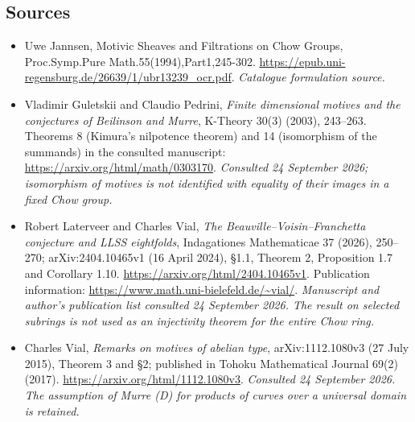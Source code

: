 \documentclass[11pt]{article}
\begin{document}
\subsection{Sources}
\begin{itemize}\raggedright
\item[\textnormal{[S1]}]\hypertarget{source:153:1}{} Uwe Jannsen, Motivic Sheaves and Filtrations on Chow Groups, Proc.Symp.Pure Math.55(1994),Part1,245-302.
\url{https://epub.uni-regensburg.de/26639/1/ubr13239_ocr.pdf}.
{\small\textit{Catalogue formulation source.}}
\item[\textnormal{[E1]}]\hypertarget{extra:153:1}{} Vladimir Guletskii and
Claudio Pedrini, \emph{Finite dimensional motives and the conjectures of
Beilinson and Murre}, K-Theory 30(3) (2003), 243--263.
Theorems 8 (Kimura's nilpotence theorem) and 14 (isomorphism of the summands)
in the consulted manuscript:
\url{https://arxiv.org/html/math/0303170}.
{\small\textit{Consulted 24 September 2026; isomorphism of motives is not
identified with equality of their images in a fixed Chow group.}}
\item[\textnormal{[E2]}]\hypertarget{extra:153:2}{} Robert Laterveer and Charles
Vial, \emph{The Beauville--Voisin--Franchetta conjecture and LLSS eightfolds},
Indagationes Mathematicae 37 (2026), 250--270;
arXiv:2404.10465v1 (16 April 2024), \S1.1, Theorem 2, Proposition 1.7 and
Corollary 1.10.
\url{https://arxiv.org/html/2404.10465v1}.
Publication information:
\url{https://www.math.uni-bielefeld.de/~vial/}.
{\small\textit{Manuscript and author's publication list consulted
24 September 2026. The result on selected subrings is not used as an
injectivity theorem for the entire Chow ring.}}
\item[\textnormal{[E3]}]\hypertarget{extra:153:3}{} Charles Vial,
\emph{Remarks on motives of abelian type}, arXiv:1112.1080v3
(27 July 2015), Theorem 3 and \S2; published in Tohoku Mathematical Journal
69(2) (2017).
\url{https://arxiv.org/html/1112.1080v3}.
{\small\textit{Consulted 24 September 2026. The assumption of Murre (D)
for products of curves over a universal domain is retained.}}
\end{itemize}
\end{document}
